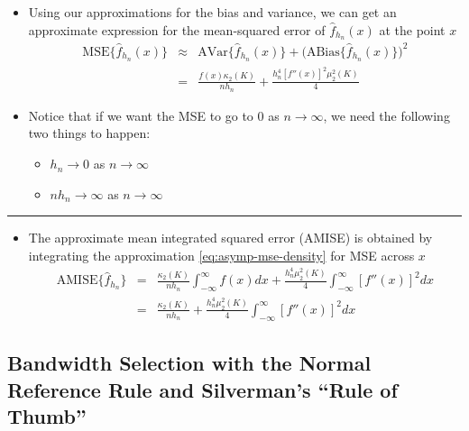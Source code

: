\documentclass[]{book}
\providecommand{\tightlist}{%
  \setlength{\itemsep}{0pt}\setlength{\parskip}{0pt}}
\begin{document}
\begin{itemize}
\item
  Using our approximations for the bias and variance, we can get an approximate expression
  for the mean-squared error of \(\hat{f}_{h_{n}}(x)\) at the point \(x\)
  \begin{eqnarray}
  \textrm{MSE}\{ \hat{f}_{h_{n}}(x) \} 
  &\approx& 
  \textrm{AVar}\{ \hat{f}_{h_{n}}(x) \} + \Big( \textrm{ABias}\{ \hat{f}_{h_{n}}(x) \} \Big)^{2} \nonumber \\
  &=& \frac{f(x)\kappa_{2}(K) }{n h_{n} } + \frac{h_{n}^{4}[f''(x)]^{2}\mu_{2}^{2}(K)}{4} 
  \label{eq:asymp-mse-density}
  \end{eqnarray}
\item
  Notice that if we want the MSE to go to \(0\) as \(n \longrightarrow \infty\), we need the
  following two things to happen:

  \begin{itemize}
  \tightlist
  \item
    \(h_{n} \longrightarrow 0\) as \(n \longrightarrow \infty\)
  \item
    \(n h_{n} \longrightarrow \infty\) as \(n \longrightarrow \infty\)
  \end{itemize}
\end{itemize}

\begin{center}\rule{0.5\linewidth}{\linethickness}\end{center}

\begin{itemize}
\tightlist
\item
  The approximate mean integrated squared error (AMISE) is obtained by integrating
  the approximation \eqref{eq:asymp-mse-density} for MSE across \(x\)
  \begin{eqnarray}
  \textrm{AMISE}\{ \hat{f}_{h_{n}} \} &=& \frac{\kappa_{2}(K) }{n h_{n} }\int_{-\infty}^{\infty} f(x) dx + \frac{h_{n}^{4}\mu_{2}^{2}(K)}{4} \int_{-\infty}^{\infty} [f''(x)]^{2} dx \nonumber \\
  &=& \frac{\kappa_{2}(K) }{n h_{n} } + \frac{h_{n}^{4}\mu_{2}^{2}(K)}{4} \int_{-\infty}^{\infty} [f''(x)]^{2} dx
  \label{eq:amise-density}
  \end{eqnarray}
\end{itemize}

\hypertarget{bandwidth-selection-with-the-normal-reference-rule-and-silvermans-rule-of-thumb}{%
\subsection{Bandwidth Selection with the Normal Reference Rule and Silverman's ``Rule of Thumb''}\label{bandwidth-selection-with-the-normal-reference-rule-and-silvermans-rule-of-thumb}}
\end{document}
